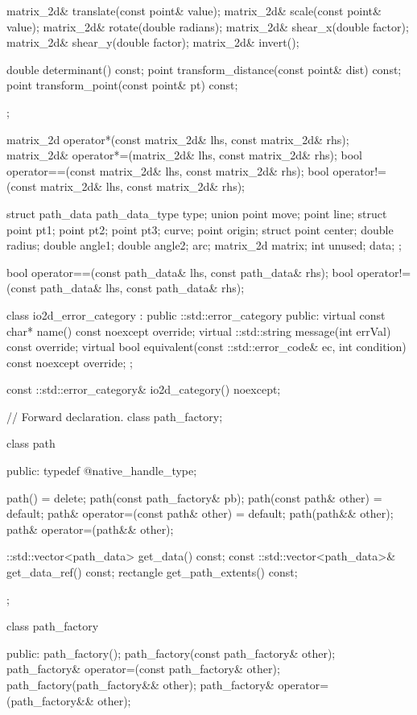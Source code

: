 \begin{codeblock}
{{{{{    matrix_2d& translate(const point& value);
    matrix_2d& scale(const point& value);
    matrix_2d& rotate(double radians);
    matrix_2d& shear_x(double factor);
    matrix_2d& shear_y(double factor);
    matrix_2d& invert();

    double determinant() const;
    point transform_distance(const point& dist) const;
    point transform_point(const point& pt) const;
  };

  matrix_2d operator*(const matrix_2d& lhs, const matrix_2d& rhs);
  matrix_2d& operator*=(matrix_2d& lhs, const matrix_2d& rhs);
  bool operator==(const matrix_2d& lhs, const matrix_2d& rhs);
  bool operator!=(const matrix_2d& lhs, const matrix_2d& rhs);

  struct path_data {
    path_data_type type;
    union {
    	point move;
    	point line;
    	struct {
    		point pt1;
    		point pt2;
    		point pt3;
    	} curve;
    	point origin;
    	struct {
    		point center;
    		double radius;
    		double angle1;
    		double angle2;
    	} arc;
    	matrix_2d matrix;
    	int unused;
    } data;
  };

  bool operator==(const path_data& lhs, const path_data& rhs);
  bool operator!=(const path_data& lhs, const path_data& rhs);

  class io2d_error_category : public ::std::error_category {
  public:
    virtual const char* name() const noexcept override;
    virtual ::std::string message(int errVal) const override;
    virtual bool equivalent(const ::std::error_code& ec, int condition) const 
    noexcept override;
  };

  const ::std::error_category& io2d_category() noexcept;

  // Forward declaration.
  class path_factory;

  class path {
  public:
    typedef @\impdef@ native_handle_type;

    path() = delete;
    path(const path_factory& pb);
    path(const path& other) = default;
    path& operator=(const path& other) = default;
    path(path&& other);
    path& operator=(path&& other);

    ::std::vector<path_data> get_data() const;
    const ::std::vector<path_data>& get_data_ref() const;
    rectangle get_path_extents() const;
  };

  class path_factory {
  public:
    path_factory();
    path_factory(const path_factory& other);
    path_factory& operator=(const path_factory& other);
    path_factory(path_factory&& other);
    path_factory& operator=(path_factory&& other);

}}}}}
\end{codeblock}
